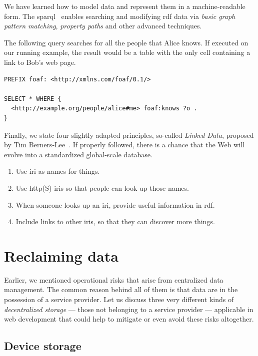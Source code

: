 We have learned how to model data and represent them in a machine-readable form. The \ac{sparql}~\cite{sparql13} enables searching and modifying \acs{rdf} data via \emph{basic graph pattern matching}, \emph{property paths} and other advanced techniques.

The following query searches for all the people that Alice knows. If executed on our running example, the result would be a table with the only cell containing a link to Bob's web page.

\begin{verbatim}
PREFIX foaf: <http://xmlns.com/foaf/0.1/>

SELECT * WHERE {
  <http://example.org/people/alice#me> foaf:knows ?o .
}
\end{verbatim}

Finally, we state four slightly adapted principles, so-called \emph{Linked Data}, proposed by Tim Berners-Lee~\cite{timbl06}. If properly followed, there is a chance that the Web will evolve into a standardized global-scale database.

\begin{enumerate}
\item Use \ac{iri} as names for things.
\item Use \acs{http}(S) \acs{iri}s so that people can look up those names.
\item When someone looks up an \acs{iri}, provide useful information in \acs{rdf}.
\item Include links to other \acs{iri}s, so that they can discover more things.
\end{enumerate}

\section{Reclaiming data}

Earlier, we mentioned operational risks that arise from centralized data management. The common reason behind all of them is that data are in the possession of a service provider. Let us discuss three very different kinds of \emph{decentralized storage} --- those not belonging to a service provider --- applicable in web development that could help to mitigate or even avoid these risks altogether.

\subsection*{Device storage}

